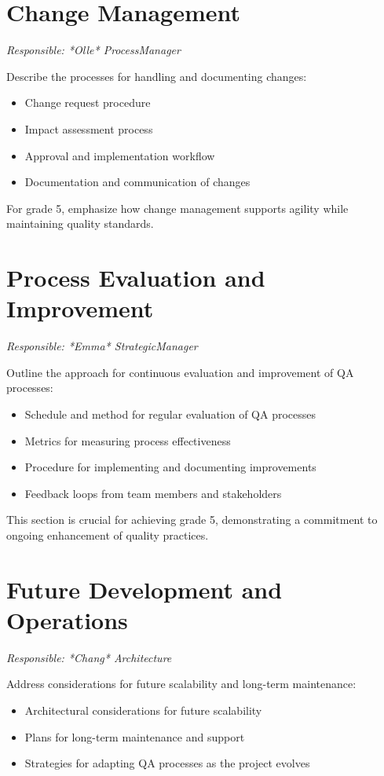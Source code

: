 \documentclass{article}
\begin{document}
\section{Change Management}
\textit{Responsible: *Olle* ProcessManager}

Describe the processes for handling and documenting changes:

\begin{itemize}
    \item Change request procedure
    \item Impact assessment process
    \item Approval and implementation workflow
    \item Documentation and communication of changes
\end{itemize}

For grade 5, emphasize how change management supports agility while maintaining quality standards.

\section{Process Evaluation and Improvement}
\textit{Responsible: *Emma* StrategicManager}

Outline the approach for continuous evaluation and improvement of QA processes:

\begin{itemize}
    \item Schedule and method for regular evaluation of QA processes
    \item Metrics for measuring process effectiveness
    \item Procedure for implementing and documenting improvements
    \item Feedback loops from team members and stakeholders
\end{itemize}

This section is crucial for achieving grade 5, demonstrating a commitment to ongoing enhancement of quality practices.

\section{Future Development and Operations}
\textit{Responsible: *Chang* Architecture}

Address considerations for future scalability and long-term maintenance:

\begin{itemize}
    \item Architectural considerations for future scalability
    \item Plans for long-term maintenance and support
    \item Strategies for adapting QA processes as the project evolves
\end{itemize}
\end{document}
